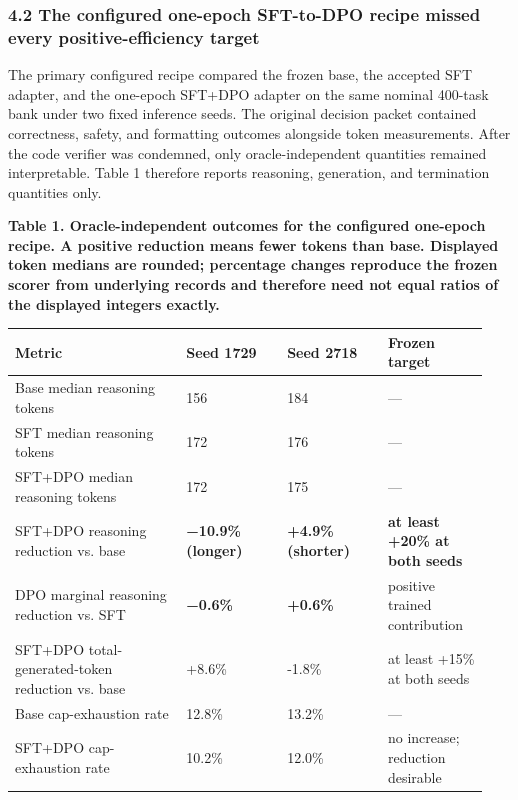 \documentclass[
]{article}
\newcounter{none} %
\begin{document}
\subsubsection{4.2 The configured one-epoch SFT-to-DPO recipe missed
every positive-efficiency
target}\label{42-the-configured-one-epoch-sft-to-dpo-recipe-missed-every-positive-efficiency-target}

The primary configured recipe compared the frozen base, the accepted SFT
adapter, and the one-epoch SFT+DPO adapter on the same nominal 400-task
bank under two fixed inference seeds. The original decision packet
contained correctness, safety, and formatting outcomes alongside token
measurements. After the code verifier was condemned, only
oracle-independent quantities remained interpretable. Table 1 therefore
reports reasoning, generation, and termination quantities only.

\textbf{Table 1. Oracle-independent outcomes for the configured
one-epoch recipe. A positive reduction means fewer tokens than base.
Displayed token medians are rounded; percentage changes reproduce the
frozen scorer from underlying records and therefore need not equal
ratios of the displayed integers exactly.}

{\def\LTcaptype{none} %
\begin{longtable}[]{@{}p{0.34\linewidth}p{0.20\linewidth}p{0.20\linewidth}p{0.20\linewidth}@{}}
\toprule\noalign{}
Metric & Seed 1729 & Seed 2718 & Frozen target \\
\midrule\noalign{}
\endhead
\bottomrule\noalign{}
\endlastfoot
Base median reasoning tokens & 156 & 184 & --- \\
SFT median reasoning tokens & 172 & 176 & --- \\
SFT+DPO median reasoning tokens & 172 & 175 & --- \\
SFT+DPO reasoning reduction vs. base & \textbf{−10.9\% (longer)} &
\textbf{+4.9\% (shorter)} & \textbf{at least +20\% at both seeds} \\
DPO marginal reasoning reduction vs. SFT & \textbf{−0.6\%} &
\textbf{+0.6\%} & positive trained contribution \\
SFT+DPO total-generated-token reduction vs. base & +8.6\% & -1.8\% & at
least +15\% at both seeds \\
Base cap-exhaustion rate & 12.8\% & 13.2\% & --- \\
SFT+DPO cap-exhaustion rate & 10.2\% & 12.0\% & no increase; reduction
desirable \\
\end{longtable}
}
\end{document}
